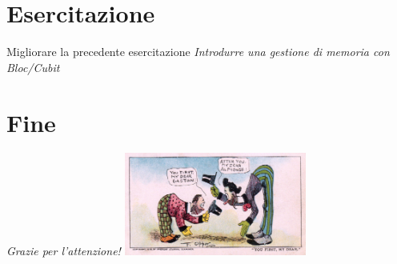 \documentclass{../libs/presentation_format}
\begin{document}

\section{Esercitazione}
\begin{frame}{Migliorare la precedente esercitazione}
	\emph{Introdurre una gestione di memoria con Bloc/Cubit}
\end{frame}



\section{Fine}
\begin{frame}{}
	\huge\emph{Grazie per l'attenzione!}
	\newline
	\vfill
	\hfill\includegraphics[width=6cm]{../libs/alphonse-gaston-regards}
\end{frame}
\end{document}

